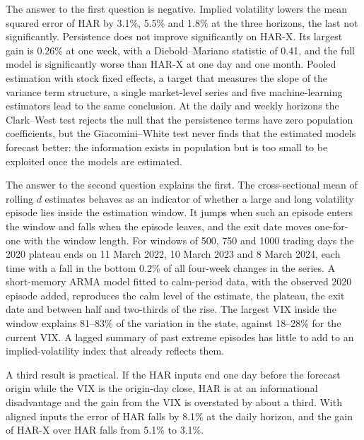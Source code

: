 The answer to the first question is negative. Implied volatility lowers the
mean squared error of HAR by 3.1\%, 5.5\% and 1.8\% at the three horizons,
the last not significantly. Persistence does not improve significantly on
HAR-X. Its largest gain is 0.26\% at one week, with a Diebold--Mariano
statistic of 0.41, and the full model is significantly worse than HAR-X at
one day and one month. Pooled estimation with stock fixed effects, a target
that measures the slope of the variance term structure, a single
market-level series and five machine-learning estimators lead to the same
conclusion. At the daily and weekly horizons the Clark--West test rejects
the null that the persistence terms have zero population coefficients, but
the Giacomini--White test never finds that the estimated models forecast
better: the information exists in population but is too small to be
exploited once the models are estimated.

The answer to the second question explains the first. The cross-sectional
mean of rolling $d$ estimates behaves as an indicator of whether a large and
long volatility episode lies inside the estimation window. It jumps when such
an episode enters the window and falls when the episode leaves, and the exit
date moves one-for-one with the window length. For windows of 500, 750 and
1000 trading days the 2020 plateau ends on 11 March 2022, 10 March 2023 and
8 March 2024, each time with a fall in the bottom 0.2\% of all four-week
changes in the series. A short-memory ARMA model fitted to calm-period data,
with the observed 2020 episode added, reproduces the calm level of the
estimate, the plateau, the exit date and between half and two-thirds of the
rise. The largest VIX inside the window explains 81--83\% of the variation in
the state, against 18--28\% for the current VIX. A lagged summary of past
extreme episodes has little to add to an implied-volatility index that
already reflects them.

A third result is practical. If the HAR inputs end one day before the
forecast origin while the VIX is the origin-day close, HAR is at an
informational disadvantage and the gain from the VIX is overstated by about
a third. With aligned inputs the error of HAR falls by 8.1\% at the daily
horizon, and the gain of HAR-X over HAR falls from 5.1\% to 3.1\%.

